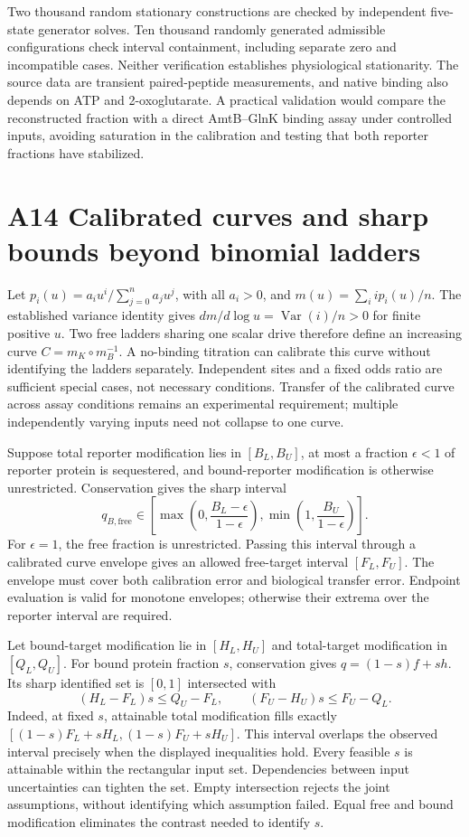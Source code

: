 \documentclass[11pt]{article}
\begin{document}
Two thousand random stationary constructions are checked by independent five-state generator solves. Ten thousand randomly generated admissible configurations check interval containment, including separate zero and incompatible cases. Neither verification establishes physiological stationarity. The source data are transient paired-peptide measurements, and native binding also depends on ATP and 2-oxoglutarate. A practical validation would compare the reconstructed fraction with a direct AmtB--GlnK binding assay under controlled inputs, avoiding saturation in the calibration and testing that both reporter fractions have stabilized.


\section*{A14 Calibrated curves and sharp bounds beyond binomial ladders}
Let $p_i(u)=a_i u^i/\sum_{j=0}^n a_j u^j$, with all $a_i>0$, and $m(u)=\sum_i ip_i(u)/n$. The established variance identity gives $d m/d\log u=\operatorname{Var}(i)/n>0$ for finite positive $u$. Two free ladders sharing one scalar drive therefore define an increasing curve $C=m_K\circ m_B^{-1}$. A no-binding titration can calibrate this curve without identifying the ladders separately. Independent sites and a fixed odds ratio are sufficient special cases, not necessary conditions. Transfer of the calibrated curve across assay conditions remains an experimental requirement; multiple independently varying inputs need not collapse to one curve.

Suppose total reporter modification lies in $[B_L,B_U]$, at most a fraction $\epsilon<1$ of reporter protein is sequestered, and bound-reporter modification is otherwise unrestricted. Conservation gives the sharp interval
\[
q_{B,\mathrm{free}}\in\left[\max\left(0,\frac{B_L-\epsilon}{1-\epsilon}\right),\min\left(1,\frac{B_U}{1-\epsilon}\right)\right].
\]
For $\epsilon=1$, the free fraction is unrestricted. Passing this interval through a calibrated curve envelope gives an allowed free-target interval $[F_L,F_U]$. The envelope must cover both calibration error and biological transfer error. Endpoint evaluation is valid for monotone envelopes; otherwise their extrema over the reporter interval are required.

Let bound-target modification lie in $[H_L,H_U]$ and total-target modification in $[Q_L,Q_U]$. For bound protein fraction $s$, conservation gives $q=(1-s)f+s h$. Its sharp identified set is $[0,1]$ intersected with
\[
(H_L-F_L)s\leq Q_U-F_L,\qquad
(F_U-H_U)s\leq F_U-Q_L.
\]
Indeed, at fixed $s$, attainable total modification fills exactly $[(1-s)F_L+sH_L,(1-s)F_U+sH_U]$. This interval overlaps the observed interval precisely when the displayed inequalities hold. Every feasible $s$ is attainable within the rectangular input set. Dependencies between input uncertainties can tighten the set. Empty intersection rejects the joint assumptions, without identifying which assumption failed. Equal free and bound modification eliminates the contrast needed to identify $s$.
\end{document}
